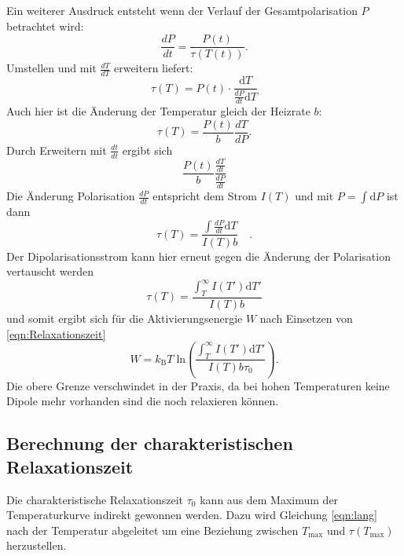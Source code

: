         Ein weiterer Ausdruck entsteht wenn der Verlauf der Gesamtpolarisation $P$ betrachtet wird:
        \begin{equation}
            \frac{dP}{dt} = \frac{P(t)}{\tau(T(t))}.
        \end{equation}
        Umstellen und mit $\frac{dT}{dT}$ erweitern liefert:
        \begin{equation}
            \tau(T) = P(t) \cdot \frac{\text{d}T}{\frac{dP}{dt}\text{d}T}
        \end{equation}
        Auch hier ist die Änderung der Temperatur gleich der Heizrate $b$:
        \begin{equation}
            \tau(T) = \frac{P(t)}{b}\frac{dT}{dP}.
        \end{equation}
        Durch Erweitern mit $\frac{dt}{dt}$ ergibt sich
        \begin{equation}
            \frac{P(t)}{b} \frac{\frac{dT}{dt}}{\frac{dP}{dt}}
        \end{equation}
        Die Änderung Polarisation $\frac{dP}{dt}$ entspricht dem Strom $I(T)$ und mit $P = \int \text{d}P$ ist dann
        \begin{equation}
            \tau(T) = \frac{\int \frac{dP}{dt}\text{d}T}{I(T)b} \quad .
        \end{equation}
        Der Dipolarisationsstrom kann hier erneut gegen die Änderung der Polarisation vertauscht werden
        \begin{equation}
            \tau(T) = \frac{\int_T^\infty I(T')\text{d}T'}{I(T)b}
        \end{equation}
        und somit ergibt sich für die Aktivierungsenergie $W$ nach Einsetzen von \autoref{eqn:Relaxationszeit}
        \begin{equation}
            W = k_\text{B}T\;\text{ln}\left( \frac{\int_T^\infty I(T')\text{d}T'}{I(T)b\tau_0}\right).
            \label{eqn:int}
        \end{equation}
        Die obere Grenze verschwindet in der Praxis, da bei hohen Temperaturen keine Dipole mehr vorhanden sind die noch relaxieren können.

\subsection{Berechnung der charakteristischen Relaxationszeit}

Die charakteristische Relaxationszeit $\tau_0$ kann aus dem Maximum der Temperaturkurve indirekt gewonnen werden.
Dazu wird Gleichung \ref{eqn:lang} nach der Temperatur abgeleitet um eine Beziehung zwischen $T_\text{max}$ und $\tau(T_\text{max})$ herzustellen.

